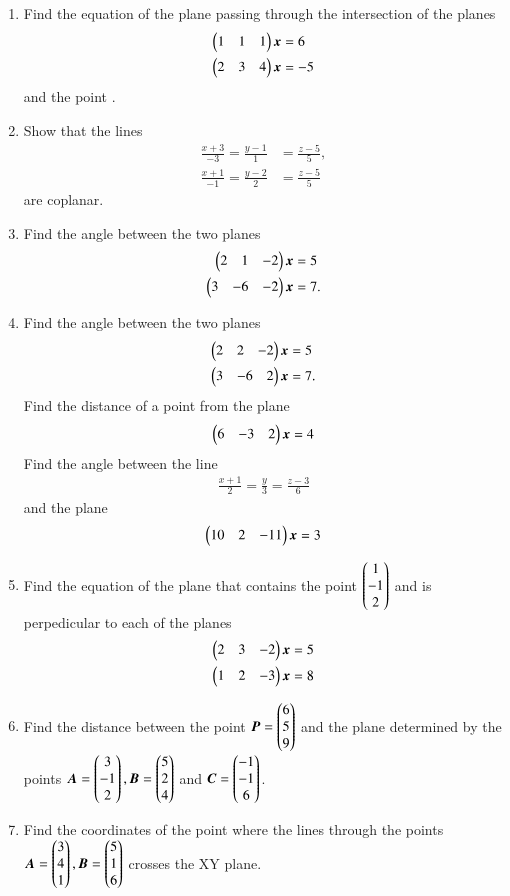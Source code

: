 \begin{enumerate}[label=\arabic*.,ref=\thesubsection.\theenumi]
\item Find the equation of the plane passing through the intersection of the planes 
\begin{align}
\begin{pmatrix}1 & 1 & 1\end{pmatrix}\bm{x}&=6  
\\
\begin{pmatrix}2 & 3 & 4\end{pmatrix}\bm{x}&=-5
\end{align}
%
and the point .
\item Show that the lines 
\begin{align}
\frac{x+3}{-3} = \frac{y-1}{1} &= \frac{z-5}{5}, 
\\
\frac{x+1}{-1} = \frac{y-2}{2} &= \frac{z-5}{5} 
\end{align}
%
are coplanar.
\item Find the angle between the two planes
\begin{align}
\begin{pmatrix}2 & 1 & -2\end{pmatrix}\bm{x}&=5
\\
\begin{pmatrix}3 &-6 & -2\end{pmatrix}\bm{x}&=7.
\end{align}
%
\item Find the angle between the two planes
\begin{align}
\begin{pmatrix}2 & 2 & -2\end{pmatrix}\bm{x}&=5
\\
\begin{pmatrix}3 &-6 & 2\end{pmatrix}\bm{x}&=7.
\end{align}
%
Find the distance of a point  from the plane
\begin{align}
\begin{pmatrix}6 & -3 & 2\end{pmatrix}\bm{x}=4
\end{align}
%
Find the angle between the line 
%
\begin{align}
\frac{x+1}{2} = \frac{y}{3} = \frac{z-3}{6} 
\end{align}
%
and
%
the plane 
\begin{align}
\begin{pmatrix}10 & 2 & -11\end{pmatrix}\bm{x}=3
\end{align}
%
\item Find the equation of the plane that contains the point $\begin{pmatrix}1\\-1\\2\end{pmatrix}$ and is perpedicular to each of the planes
\begin{align}
\begin{pmatrix}2 & 3 & -2\end{pmatrix}\bm{x}&=5
\\
\begin{pmatrix}1 & 2 & -3\end{pmatrix}\bm{x}&=8
\end{align}
%
\item Find the distance between the point $\bm{P}=\begin{pmatrix}6\\5\\9\end{pmatrix}$ and the plane determined by the points $\bm{A}=\begin{pmatrix}3\\-1\\2\end{pmatrix}, \bm{B}=\begin{pmatrix}5\\2\\4\end{pmatrix}$ and $\bm{C}=\begin{pmatrix}-1\\-1\\6\end{pmatrix}$.
\item Find the coordinates of the point where the lines through the points
$
\bm{A}=\begin{pmatrix}3\\4\\1\end{pmatrix}, 
\bm{B}=\begin{pmatrix}5\\1\\6\end{pmatrix}
$
crosses the XY plane.
%
\end{enumerate}
%
